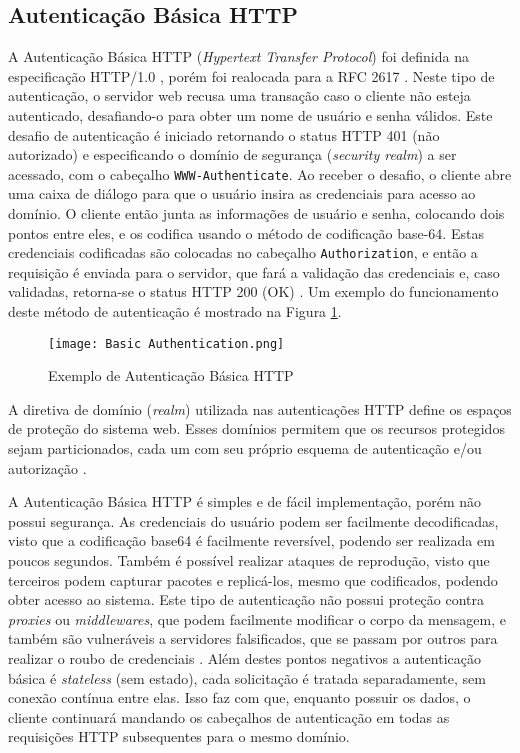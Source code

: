 \subsection{Autenticação Básica HTTP}

A Autenticação Básica HTTP (\emph{Hypertext Transfer Protocol}) foi definida na especificação
HTTP/1.0 \cite{RFC1945}, porém foi realocada para a RFC 2617 \cite{RFC2617}. Neste tipo de
autenticação, o servidor web recusa uma transação caso o cliente não esteja autenticado,
desafiando-o para obter um nome de usuário e senha válidos. Este desafio de autenticação é iniciado
retornando o status HTTP 401 (não autorizado) e especificando o domínio de segurança
(\emph{security realm}) a ser acessado, com o cabeçalho \texttt{WWW-Authenticate}. Ao receber o 
desafio, o cliente abre uma caixa de diálogo para que o usuário insira as credenciais para acesso 
ao domínio. O cliente então junta as informações de usuário e senha, colocando dois pontos entre 
eles, e os codifica usando o método de codificação base-64. Estas credenciais codificadas são 
colocadas no cabeçalho \texttt{Authorization}, e então a requisição é enviada para o servidor, que 
fará a validação das credenciais e, caso validadas, retorna-se o status HTTP 200 (OK) 
\cite{GOURLEY2002}. Um exemplo do funcionamento deste método de autenticação é mostrado na Figura 
\ref{fig:basicAuth}.

\begin{figure}[ht]
  \centering
  \texttt{[image: Basic Authentication.png]}
  \caption{Exemplo de Autenticação Básica HTTP}
  \label{fig:basicAuth}
\end{figure}

A diretiva de domínio (\emph{realm}) utilizada nas autenticações HTTP define os espaços de proteção 
do sistema web. Esses domínios permitem que os recursos protegidos sejam particionados, cada um com 
seu próprio esquema de autenticação e/ou autorização \cite{RFC2617}.

A Autenticação Básica HTTP é simples e de fácil implementação, porém não possui segurança. As 
credenciais do usuário podem ser facilmente decodificadas, visto que a codificação base64 é 
facilmente reversível, podendo ser realizada em poucos segundos. Também é possível realizar ataques 
de reprodução, visto que terceiros podem capturar pacotes e replicá-los, mesmo que codificados, 
podendo obter acesso ao sistema. Este tipo de autenticação não possui proteção contra \emph{proxies} 
ou \emph{middlewares}, que podem facilmente modificar o corpo da mensagem, e também são vulneráveis 
a servidores falsificados, que se passam por outros para realizar o roubo de credenciais 
\cite{GOURLEY2002}. Além destes pontos negativos a autenticação básica é \emph{stateless} (sem estado), cada solicitação é tratada separadamente, sem conexão contínua entre elas. Isso faz com que, enquanto possuir os dados, o cliente continuará mandando os cabeçalhos de autenticação em todas as requisições HTTP subsequentes para o mesmo domínio.